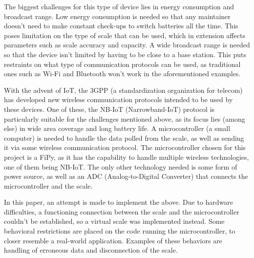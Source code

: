 The biggest challenges for this type of device lies in energy consumption and broadcast range. Low energy consumption is needed so that any maintainer doesn't need to make constant check-ups to switch batteries all the time. This poses limitation on the type of scale that can be used, which in extension affects parameters such as scale accuracy and capacity. A wide broadcast range is needed so that the device isn't limited by having to be close to a base station. This puts restraints on what type of communication protocols can be used, as traditional ones such as Wi-Fi and Bluetooth won't work in the aforementioned examples.

With the advent of IoT, the 3GPP (a standardization organization for telecom) has developed new wireless communication protocols intended to be used by these devices. One of these, the NB-IoT (Narrowband-IoT) protocol is particularly suitable for the challenges mentioned above, as its focus lies (among else) in wide area coverage and long battery life. A microcontroller (a small computer) is needed to handle the data polled from the scale, as well as sending it via some wireless communication protocol. The microcontroller chosen for this project is a FiPy, as it has the capability to handle multiple wireless technologies, one of them being NB-IoT. The only other technology needed is some form of power source, as well as an ADC (Analog-to-Digital Converter) that connects the microcontroller and the scale.

In this paper, an attempt is made to implement the above. Due to hardware difficulties, a functioning connection between the scale and the microcontroller couldn't be established, so a virtual scale was implemented instead. Some behavioral restrictions are placed on the code running the microcontroller, to closer resemble a real-world application. Examples of these behaviors are handling of erroneous data and disconnection of the scale.




